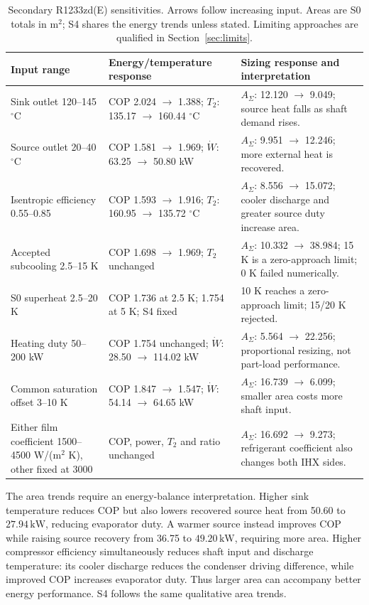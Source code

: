 \documentclass[11pt,a4paper]{article}
\begin{document}
\begin{table}[H]
\centering\small
\caption{Secondary R1233zd(E) sensitivities. Arrows follow increasing input.
 Areas are S0 totals in m$^2$; S4 shares the energy trends unless stated.
 Limiting approaches are qualified in Section~\ref{sec:limits}.}
\label{tab:sensitivities}
\renewcommand{\arraystretch}{1.15}
\begin{tabularx}{\textwidth}{@{}p{} Y Y@{}}
\toprule
Input range & Energy/temperature response & Sizing response and interpretation\\
\midrule
Sink outlet 120--145 $^\circ$C & COP 2.024 $\to$ 1.388;
 $T_2$: 135.17 $\to$ 160.44 $^\circ$C &
 $A_\Sigma$: 12.120 $\to$ 9.049; source heat falls as shaft demand rises.\\
Source outlet 20--40 $^\circ$C & COP 1.581 $\to$ 1.969;
 $\dot W$: 63.25 $\to$ 50.80 kW &
 $A_\Sigma$: 9.951 $\to$ 12.246; more external heat is recovered.\\
Isentropic efficiency 0.55--0.85 & COP 1.593 $\to$ 1.916;
 $T_2$: 160.95 $\to$ 135.72 $^\circ$C &
 $A_\Sigma$: 8.556 $\to$ 15.072; cooler discharge and greater source duty increase area.\\
Accepted subcooling 2.5--15 K & COP 1.698 $\to$ 1.969;
 $T_2$ unchanged & $A_\Sigma$: 10.332 $\to$ 38.984;
 15 K is a zero-approach limit; 0 K failed numerically.\\
S0 superheat 2.5--20 K & COP 1.736 at 2.5 K; 1.754 at 5 K;
 S4 fixed & 10 K reaches a zero-approach limit;
 15/20 K rejected.\\
Heating duty 50--200 kW & COP 1.754 unchanged;
 $\dot W$: 28.50 $\to$ 114.02 kW &
 $A_\Sigma$: 5.564 $\to$ 22.256; proportional resizing, not part-load performance.\\
Common saturation offset 3--10 K & COP 1.847 $\to$ 1.547;
 $\dot W$: 54.14 $\to$ 64.65 kW &
 $A_\Sigma$: 16.739 $\to$ 6.099; smaller area costs more shaft input.\\
Either film coefficient 1500--4500 W/(m$^2$ K), other fixed at 3000 &
 COP, power, $T_2$ and ratio unchanged &
 $A_\Sigma$: 16.692 $\to$ 9.273;
 refrigerant coefficient also changes both IHX sides.\\
\bottomrule
\end{tabularx}
\end{table}

The area trends require an energy-balance interpretation. Higher sink
temperature reduces COP but also lowers recovered source heat from 50.60
to $27.94\,\mathrm{kW}$, reducing evaporator duty. A warmer source instead
improves COP while raising source recovery from 36.75 to
$49.20\,\mathrm{kW}$, requiring more area. Higher compressor efficiency
simultaneously reduces shaft input and discharge temperature: its cooler
discharge reduces the condenser driving difference, while improved COP
increases evaporator duty. Thus larger area can accompany better energy
performance. S4 follows the same qualitative area trends.
\end{document}
